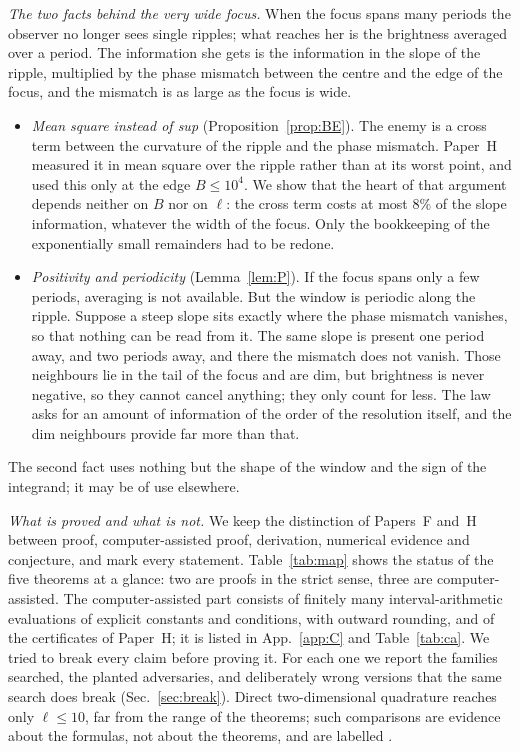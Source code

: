 \emph{The two facts behind the very wide focus.}
When the focus spans many periods the observer no longer sees single ripples; what reaches her is the brightness averaged over a period.
The information she gets is the information in the slope of the ripple, multiplied by the phase mismatch between the centre and the edge of the focus, and the mismatch is as large as the focus is wide.
\begin{itemize}
\item \emph{Mean square instead of sup} (Proposition~\ref{prop:BE}).
  The enemy is a cross term between the curvature of the ripple and the phase mismatch.
  Paper~H measured it in mean square over the ripple rather than at its worst point, and used this only at the edge $B\le10^4$.
  We show that the heart of that argument depends neither on $B$ nor on $\ell$: the cross term costs at most $8\%$ of the slope information, whatever the width of the focus.
  Only the bookkeeping of the exponentially small remainders had to be redone.
\item \emph{Positivity and periodicity} (Lemma~\ref{lem:P}).
  If the focus spans only a few periods, averaging is not available.
  But the window is periodic along the ripple.
  Suppose a steep slope sits exactly where the phase mismatch vanishes, so that nothing can be read from it.
  The same slope is present one period away, and two periods away, and there the mismatch does not vanish.
  Those neighbours lie in the tail of the focus and are dim, but brightness is never negative, so they cannot cancel anything; they only count for less.
  The law asks for an amount of information of the order of the resolution itself, and the dim neighbours provide far more than that.
\end{itemize}
The second fact uses nothing but the shape of the window and the sign of the integrand; it may be of use elsewhere.

\emph{What is proved and what is not.}
We keep the distinction of Papers~F and~H between proof, computer-assisted proof, derivation, numerical evidence and conjecture, and mark every statement.
Table~\ref{tab:map} shows the status of the five theorems at a glance: two are proofs in the strict sense, three are computer-assisted.
The computer-assisted part consists of finitely many interval-arithmetic evaluations of explicit constants and conditions, with outward rounding, and of the certificates of Paper~H; it is listed in App.~\ref{app:C} and Table~\ref{tab:ca}.
We tried to break every claim before proving it.
For each one we report the families searched, the planted adversaries, and deliberately wrong versions that the same search does break (Sec.~\ref{sec:break}).
Direct two-dimensional quadrature reaches only $\ell\le10$, far from the range of the theorems; such comparisons are evidence about the formulas, not about the theorems, and are labelled \numst.

